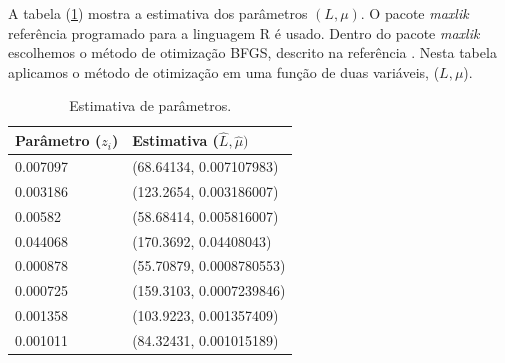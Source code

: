 \documentclass[journal,article,submit,moreauthors,pdftex]{Definitions/mdpi}
\begin{document}
A tabela (\ref{tab_est_l_mu_z_fixo}) mostra a estimativa dos parâmetros $(L,\mu)$. O pacote {\it maxlik} referência \cite{ht_2011} programado para a linguagem R é usado. Dentro do pacote {\it maxlik} escolhemos o método de otimização BFGS, descrito na referência \cite{nw_2006}. Nesta tabela aplicamos o método de otimização em uma função de duas variáveis, ($L,\mu$).  
\begin{table}[hbt]
	\centering
	\caption{Estimativa de parâmetros.}\label{tab_est_l_mu_z_fixo}
\begin{tabular}{@{}ll@{}} \toprule
	Parâmetro ($z_i$)  & Estimativa ($\hat{L}, \hat{\mu})$ \\ \midrule
	0.007097 & (68.64134,  0.007107983) \\ 
	0.003186 & (123.2654,  0.003186007)\\
	0.00582  & (58.68414,  0.005816007) \\
	0.044068 & (170.3692,  0.04408043) \\
	0.000878 & (55.70879,  0.0008780553) \\
	 0.000725& (159.3103,  0.0007239846)\\
	 0.001358& (103.9223,  0.001357409)\\ 
	 0.001011& (84.32431,  0.001015189)\\ \bottomrule
\end{tabular}
\end{table}
\end{document}

